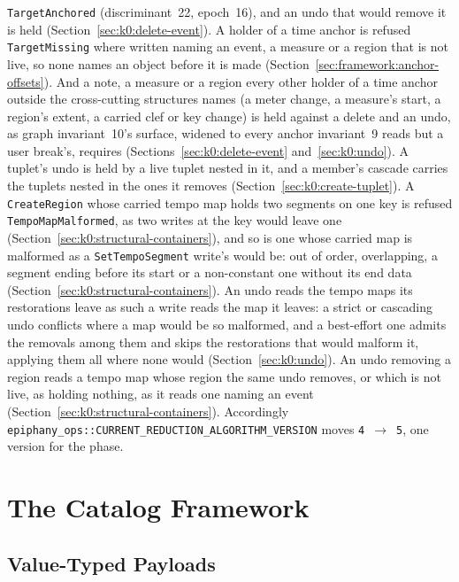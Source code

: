 \documentclass[11pt,letterpaper]{report}
\begin{document}
\texttt{TargetAnchored} (discriminant~22, epoch~16), and an undo that would
remove it is held (Section~\ref{sec:k0:delete-event}). A holder of a time
anchor is refused \texttt{TargetMissing} where written naming an event, a
measure or a region that is not live, so none names an object before it is
made (Section~\ref{sec:framework:anchor-offsets}). And a note, a measure or a
region every other holder of a time anchor outside the cross-cutting
structures names (a meter change, a measure's start, a region's extent, a
carried clef or key change) is held against a delete and an undo, as graph
invariant~10's surface, widened to every anchor invariant~9 reads but a user
break's, requires (Sections~\ref{sec:k0:delete-event}
and~\ref{sec:k0:undo}). A tuplet's undo is held by a live tuplet nested in it,
and a member's cascade carries the tuplets nested in the ones it removes
(Section~\ref{sec:k0:create-tuplet}). A \texttt{CreateRegion} whose carried
tempo map holds two segments on one key is refused \texttt{TempoMapMalformed},
as two writes at the key would leave one
(Section~\ref{sec:k0:structural-containers}), and so is one whose carried map
is malformed as a \texttt{SetTempoSegment} write's would be: out of order,
overlapping, a segment ending before its start or a non-constant one without
its end data (Section~\ref{sec:k0:structural-containers}). An undo reads the
tempo maps its restorations leave as such a write reads the map it leaves: a
strict or cascading undo conflicts where a map would be so malformed, and a
best-effort one admits the removals among them and skips the restorations
that would malform it, applying them all where none would
(Section~\ref{sec:k0:undo}). An undo removing a region reads
a tempo map whose region the same undo removes, or which is not live, as
holding nothing, as it reads one naming an event
(Section~\ref{sec:k0:structural-containers}). Accordingly
\texttt{epiphany\_ops::CURRENT\_REDUCTION\_ALGORITHM\_VERSION} moves
\texttt{4}~$\rightarrow$~\texttt{5}, one version for the phase.

\chapter{The Catalog Framework}
\label{ch:framework}

\section{Value-Typed Payloads}
\label{sec:framework:value-typed}
\end{document}
